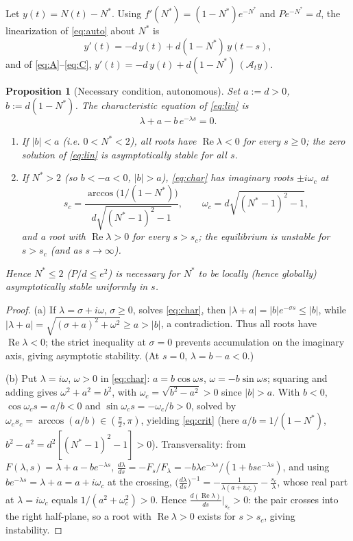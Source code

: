 \documentclass[12pt]{article}
\newtheorem{proposition}{Proposition}
\theoremstyle{definition}
\begin{document}
Let $y(t)=N(t)-N^*$. Using $f'(N^*)=(1-N^*)e^{-N^*}$ and $Pe^{-N^*}=d$, the
linearization of \eqref{eq:auto} about $N^*$ is
\begin{equation}\label{eq:lin}
  y'(t)=-d\,y(t)+d(1-N^*)\,y(t-s),
\end{equation}
and of \eqref{eq:A}--\eqref{eq:C}, $y'(t)=-d\,y(t)+d(1-N^*)\,(\mathcal A_t y)$.

\begin{proposition}[Necessary condition, autonomous]\label{prop:nec-auto}
Set $a:=d>0$, $b:=d(1-N^*)$. The characteristic equation of \eqref{eq:lin} is
\begin{equation}\label{eq:char}
  \lambda+a-b\,e^{-\lambda s}=0 .
\end{equation}
\begin{enumerate}
\item[\rm(a)] If $|b|<a$ (i.e. $0<N^*<2$), all roots have
$\operatorname{Re}\lambda<0$ for every $s\ge0$; the zero solution of
\eqref{eq:lin} is asymptotically stable for all $s$.
\item[\rm(b)] If $N^*>2$ (so $b<-a<0$, $|b|>a$), \eqref{eq:char} has imaginary
roots $\pm i\omega_c$ at
\begin{equation}\label{eq:crit}
  s_c=\frac{\arccos\!\bigl(1/(1-N^*)\bigr)}{d\sqrt{(N^*-1)^2-1}},\qquad
  \omega_c=d\sqrt{(N^*-1)^2-1},
\end{equation}
and a root with $\operatorname{Re}\lambda>0$ for every $s>s_c$; the equilibrium
is unstable for $s>s_c$ (and as $s\to\infty$).
\end{enumerate}
Hence $N^*\le2$ ($P/d\le e^2$) is \emph{necessary} for $N^*$ to be locally
(hence globally) asymptotically stable uniformly in $s$.
\end{proposition}

\begin{proof}
(a) If $\lambda=\sigma+i\omega$, $\sigma\ge0$, solves \eqref{eq:char}, then
$|\lambda+a|=|b|e^{-\sigma s}\le|b|$, while
$|\lambda+a|=\sqrt{(\sigma+a)^2+\omega^2}\ge a>|b|$, a contradiction. Thus all
roots have $\operatorname{Re}\lambda<0$; the strict inequality at $\sigma=0$
prevents accumulation on the imaginary axis, giving asymptotic stability. (At
$s=0$, $\lambda=b-a<0$.)

(b) Put $\lambda=i\omega$, $\omega>0$ in \eqref{eq:char}:
$a=b\cos\omega s$, $\omega=-b\sin\omega s$; squaring and adding gives
$\omega^2+a^2=b^2$, with $\omega_c=\sqrt{b^2-a^2}>0$ since $|b|>a$. With $b<0$,
$\cos\omega_c s=a/b<0$ and $\sin\omega_c s=-\omega_c/b>0$, solved by
$\omega_c s_c=\arccos(a/b)\in(\tfrac\pi2,\pi)$, yielding \eqref{eq:crit} (here
$a/b=1/(1-N^*)$, $b^2-a^2=d^2[(N^*-1)^2-1]>0$). Transversality: from
$F(\lambda,s)=\lambda+a-be^{-\lambda s}$,
$\frac{d\lambda}{ds}=-F_s/F_\lambda
=-b\lambda e^{-\lambda s}/(1+bse^{-\lambda s})$, and using
$be^{-\lambda s}=\lambda+a=a+i\omega_c$ at the crossing,
$\bigl(\tfrac{d\lambda}{ds}\bigr)^{-1}
=-\tfrac{1}{\lambda(a+i\omega_c)}-\tfrac{s_c}{\lambda}$, whose real part at
$\lambda=i\omega_c$ equals $1/(a^2+\omega_c^2)>0$. Hence
$\frac{d(\operatorname{Re}\lambda)}{ds}\big|_{s_c}>0$: the pair crosses into the
right half-plane, so a root with $\operatorname{Re}\lambda>0$ exists for
$s>s_c$, giving instability.
\end{proof}
\end{document}
